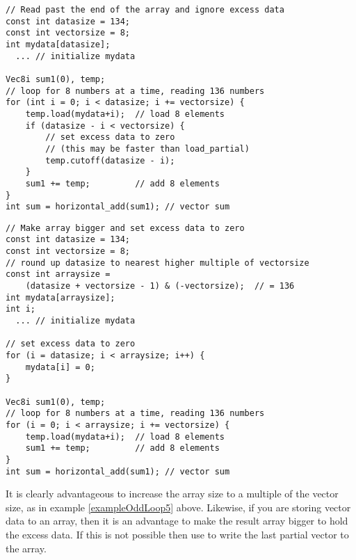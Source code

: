 \documentclass[vcl_manual.tex]{subfiles}
\begin{document}
\begin{example}
\label{exampleOddLoop4}
\end{example}
\begin{lstlisting}[frame=single]
// Read past the end of the array and ignore excess data
const int datasize = 134;
const int vectorsize = 8;
int mydata[datasize];
  ... // initialize mydata

Vec8i sum1(0), temp;
// loop for 8 numbers at a time, reading 136 numbers
for (int i = 0; i < datasize; i += vectorsize) {
    temp.load(mydata+i);  // load 8 elements
    if (datasize - i < vectorsize) {
        // set excess data to zero
        // (this may be faster than load_partial)
        temp.cutoff(datasize - i);
    }
    sum1 += temp;         // add 8 elements
}
int sum = horizontal_add(sum1); // vector sum
\end{lstlisting}


\begin{example}
\label{exampleOddLoop5}
\end{example}
\begin{lstlisting}[frame=single]
// Make array bigger and set excess data to zero
const int datasize = 134;
const int vectorsize = 8;
// round up datasize to nearest higher multiple of vectorsize
const int arraysize = 
    (datasize + vectorsize - 1) & (-vectorsize);  // = 136
int mydata[arraysize];
int i;
  ... // initialize mydata

// set excess data to zero
for (i = datasize; i < arraysize; i++) {
    mydata[i] = 0;
}

Vec8i sum1(0), temp;
// loop for 8 numbers at a time, reading 136 numbers
for (i = 0; i < arraysize; i += vectorsize) {
    temp.load(mydata+i);  // load 8 elements
    sum1 += temp;         // add 8 elements
}
int sum = horizontal_add(sum1); // vector sum
\end{lstlisting}

It is clearly advantageous to increase the array size to a multiple of the vector size, as in example \ref{exampleOddLoop5} above. Likewise, if you are storing vector data to an array, then it is an advantage to make the result array bigger to hold the excess data. If this is not possible then use  to write the last partial vector to the array.
\end{document}
